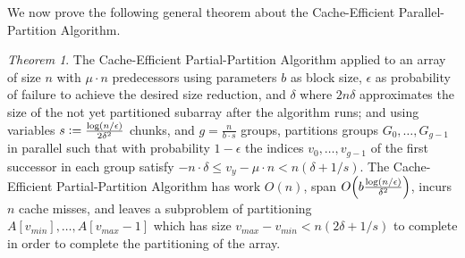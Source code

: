 \documentclass[sigconf]{acmart}
\newcommand{\defeq}{\vcentcolon=}
\DeclarePairedDelimiter{\paren}{(}{)}
\renewcommand{\paragraph}[1]{\vspace{0.09in}\noindent{\bf \boldmath #1.}}
\theoremstyle{remark}
\newtheorem{theorem}{Theorem}[section]
\theoremstyle{remark}
\begin{document}
\paragraph{Algorithm Analysis}
We now prove the following general theorem about the Cache-Efficient Parallel-Partition Algorithm.
\begin{theorem}
	\label{thm:generalResult}
	The Cache-Efficient Partial-Partition Algorithm applied to an array of size $n$ with $\mu \cdot n$ predecessors using parameters $b$ as block size, $\epsilon$ as probability of failure to achieve the desired size reduction, and $\delta$ where $2n\delta$ approximates the size of the not yet partitioned subarray after the algorithm runs; and using variables $s\defeq \frac{\log (n/\epsilon)}{2\delta^2}$ chunks, and $g=\frac{n}{b\cdot s}$ groups, partitions groups $G_0, \ldots, G_{g-1}$ in parallel such that with probability $1-\epsilon$ the indices $v_0,\ldots, v_{g-1}$ of the first successor in each group satisfy $-n \cdot \delta \leq v_y - \mu \cdot n < n (\delta + 1/s)$. 
	The Cache-Efficient Partial-Partition Algorithm has work $O(n)$, span $O\paren*{b \frac{\log (n/\epsilon)}{\delta^2}}$, incurs $n$ cache misses, and leaves a subproblem of partitioning $A[v_{min}],\ldots, A[v_{max}-1]$ which has size $v_{max}-v_{min} < n(2\delta + 1/s)$ to complete in order to complete the partitioning of the array. 
\end{theorem}
\end{document}
